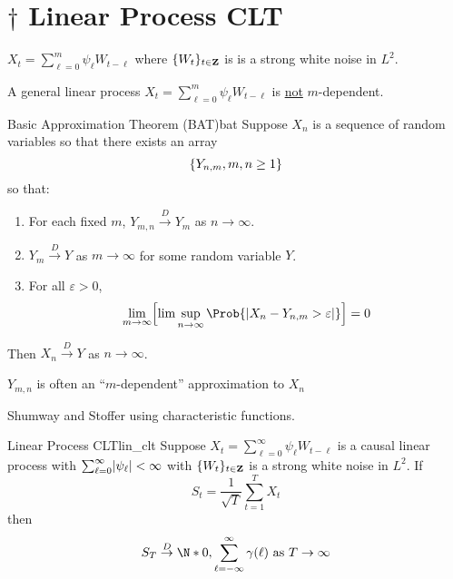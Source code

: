 \section{\texorpdfstring{$ \dagger $}{†} Linear Process CLT}
\begin{Example}{}{}
    $ \displaystyle X_t=\sum_{\ell=0}^{m} \psi_\ell W_{t-\ell} $
    where $ \{W_t\}_{t\in\mathbf{Z}} $ is
    is a strong white noise in $ L^2 $.

    A general linear process $ \displaystyle X_t=\sum_{\ell=0}^{m} \psi_\ell W_{t-\ell} $
    is \underline{not} $ m $-dependent.
\end{Example}
\begin{Theorem}{Basic Approximation Theorem (BAT)}{bat}
    Suppose $ X_n $ is a sequence of random variables
    so that there exists an array
    \[ \{Y_{n,m},m,n\ge 1\} \]
    so that:
    \begin{enumerate}[(1)]
        \item For each fixed $ m $, $ Y_{m,n}\stackrel{D}{\to}Y_m $
              as $ n\to\infty $.
        \item $ Y_m\stackrel{D}{\to} Y $ as $ m\to\infty $ for some random variable $ Y $.
        \item For all $ \varepsilon>0 $,
              \[ \lim\limits_{{m} \to {\infty}}
                  \Bigl[\lim\sup\limits_{{n} \to {\infty}}
                  \Prob{\abs{X_n-Y_{n,m}>\varepsilon}} \Bigr]=0 \]
    \end{enumerate}
    Then $ X_n\stackrel{D}{\to}Y $ as $ n\to\infty $.
\end{Theorem}
\begin{Remark}{}{}
    $ Y_{m,n} $ is often an ``$ m $-dependent'' approximation to $ X_n $
\end{Remark}
\begin{Proof}{}{}
    Shumway and Stoffer using characteristic functions.
\end{Proof}
\begin{Theorem}{Linear Process CLT}{lin_clt}
    Suppose $ X_t=\sum_{\ell=0}^{\infty} \psi_\ell W_{t-\ell} $ is a causal
    linear process with $ \sum_{\ell=0}^{\infty} \lvert\psi_\ell\rvert<\infty $
    with $ \{W_t\}_{t\in\mathbf{Z}} $ is a strong white noise in
    $ L^2 $. If
    \[ S_t=\frac{1}{\sqrt{T}} \sum_{t=1}^{T} X_t \]
    then
    \[ S_T\stackrel{D}{\to}\N*{0,\sum_{\ell=-\infty}^{\infty} \gamma(\ell)}\text{ as }
        T\to\infty \]
\end{Theorem}
